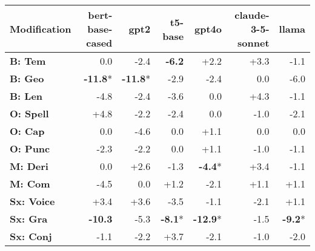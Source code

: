 \begin{table}[h]
\centering
\begin{tabular}{lrrrrrr}
\hline
Modification & \textbf{bert-base-cased} & \textbf{gpt2} & \textbf{t5-base} & \textbf{gpt4o} & \textbf{claude-3-5-sonnet} & \textbf{llama} \\
\hline
\textbf{B: Tem} & \cellcolor{red!0} 0.0 & \cellcolor{red!7} -2.4 & \cellcolor{red!18} \textbf{-6.2} & \cellcolor{green!6} +2.2 & \cellcolor{green!9} +3.3 & \cellcolor{red!3} -1.1 \\
\textbf{B: Geo} & \cellcolor{red!30} \textbf{-11.8}* & \cellcolor{red!30} \textbf{-11.8}* & \cellcolor{red!8} -2.9 & \cellcolor{red!7} -2.4 & \cellcolor{red!0} 0.0 & \cellcolor{red!18} -6.0 \\
\textbf{B: Len} & \cellcolor{red!14} -4.8 & \cellcolor{red!7} -2.4 & \cellcolor{red!10} -3.6 & \cellcolor{red!0} 0.0 & \cellcolor{green!12} +4.3 & \cellcolor{red!3} -1.1 \\
\hline
\textbf{O: Spell} & \cellcolor{green!14} +4.8 & \cellcolor{red!6} -2.2 & \cellcolor{red!7} -2.4 & \cellcolor{red!0} 0.0 & \cellcolor{red!3} -1.0 & \cellcolor{red!6} -2.1 \\
\textbf{O: Cap} & \cellcolor{red!0} 0.0 & \cellcolor{red!13} -4.6 & \cellcolor{red!0} 0.0 & \cellcolor{green!3} +1.1 & \cellcolor{red!0} 0.0 & \cellcolor{red!0} 0.0 \\
\textbf{O: Punc} & \cellcolor{red!6} -2.3 & \cellcolor{red!6} -2.2 & \cellcolor{red!0} 0.0 & \cellcolor{green!3} +1.1 & \cellcolor{red!3} -1.0 & \cellcolor{red!3} -1.1 \\
\hline
\textbf{M: Deri} & \cellcolor{red!0} 0.0 & \cellcolor{green!7} +2.6 & \cellcolor{red!3} -1.3 & \cellcolor{red!13} \textbf{-4.4}* & \cellcolor{green!10} +3.4 & \cellcolor{red!3} -1.1 \\
\textbf{M: Com} & \cellcolor{red!13} -4.5 & \cellcolor{red!0} 0.0 & \cellcolor{green!3} +1.2 & \cellcolor{red!6} -2.1 & \cellcolor{green!3} +1.1 & \cellcolor{green!3} +1.1 \\
\hline
\textbf{Sx: Voice} & \cellcolor{green!10} +3.4 & \cellcolor{green!10} +3.6 & \cellcolor{red!10} -3.5 & \cellcolor{red!3} -1.1 & \cellcolor{red!6} -2.1 & \cellcolor{green!3} +1.1 \\
\textbf{Sx: Gra} & \cellcolor{red!30} \textbf{-10.3} & \cellcolor{red!15} -5.3 & \cellcolor{red!24} \textbf{-8.1}* & \cellcolor{red!30} \textbf{-12.9}* & \cellcolor{red!4} -1.5 & \cellcolor{red!27} \textbf{-9.2}* \\
\textbf{Sx: Conj} & \cellcolor{red!3} -1.1 & \cellcolor{red!6} -2.2 & \cellcolor{green!11} +3.7 & \cellcolor{red!6} -2.1 & \cellcolor{red!3} -1.0 & \cellcolor{red!6} -2.0 \\

\end{tabular}
\end{table}
